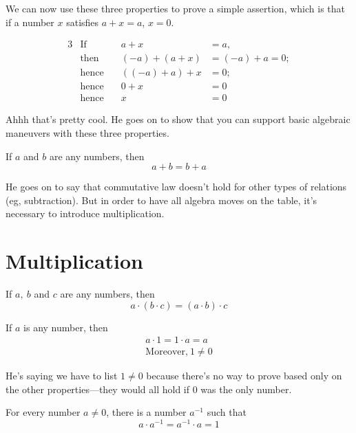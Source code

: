 We can now use these three properties to prove a simple assertion, which is that if a
number $x$ satisfies $a + x = a$, $x=0$.

\begin{alignat*}{3}
    &\text{If} \quad&  a + x &= a,\\
    &\text{then} \quad & (-a) + (a + x) &= (-a) + a = 0;\\
    &\text{hence} \quad & ((-a) + a) + x &= 0;\\
    &\text{hence} \quad & 0 + x &= 0\\
    &\text{hence} \quad & x &=0
\end{alignat*}

Ahhh that's pretty cool. He goes on to show that you can support basic algebraic maneuvers
with these three properties. 

\begin{property}
    If $a$ and $b$ are any numbers, then
    $$
    a + b = b + a
    $$
\end{property}

He goes on to say that commutative law doesn't hold for other types of relations (eg,
subtraction). But in order to have all algebra moves on the table, it's necessary to
introduce multiplication.

\section{Multiplication}

\begin{property}
    If $a,~b$ and $c$ are any numbers, then
    $$
    a \cdot (b\cdot c) = (a \cdot b) \cdot c
    $$
\end{property}

\begin{property}
    If $a$ is any number, then
    \begin{align*}
        a \cdot 1 = 1 \cdot a = a\\
        \text{Moreover,}~1 \neq 0
    \end{align*}
\end{property}

He's saying we have to list $1\neq 0$ because there's no way to prove based only on the
other properties---they would all hold if $0$ was the only number. 

\begin{property}\label{prop:multinverse}
    For every number $a \neq 0$, there is a number $a^{-1}$ such that
    $$
    a \cdot a^{-1} = a^{-1} \cdot a = 1
    $$
\end{property}

